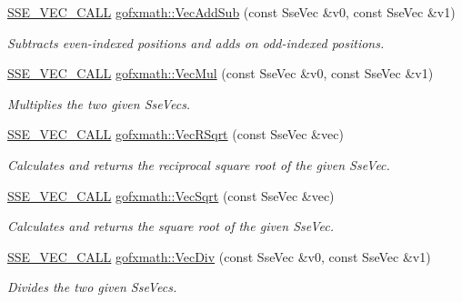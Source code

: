 \begin{DoxyCompactItemize}
\hyperlink{ssevec__math__defs_8h_a97454f977a5281455cecacce1e8ba670}{S\+S\+E\+\_\+\+V\+E\+C\+\_\+\+C\+A\+L\+L} \hyperlink{group___s_i_m_d_vec_math_gac6a154e8cd9fe66c30e8b2302815b0df}{gofxmath\+::\+Vec\+Add\+Sub} (const Sse\+Vec \&v0, const Sse\+Vec \&v1)
\begin{DoxyCompactList}\small\item\em Subtracts even-\/indexed positions and adds on odd-\/indexed positions. \end{DoxyCompactList}\item 
\hyperlink{ssevec__math__defs_8h_a97454f977a5281455cecacce1e8ba670}{S\+S\+E\+\_\+\+V\+E\+C\+\_\+\+C\+A\+L\+L} \hyperlink{group___s_i_m_d_vec_math_ga8bd586fb40d6514eb52c04f8ded33a74}{gofxmath\+::\+Vec\+Mul} (const Sse\+Vec \&v0, const Sse\+Vec \&v1)
\begin{DoxyCompactList}\small\item\em Multiplies the two given Sse\+Vecs. \end{DoxyCompactList}\item 
\hyperlink{ssevec__math__defs_8h_a97454f977a5281455cecacce1e8ba670}{S\+S\+E\+\_\+\+V\+E\+C\+\_\+\+C\+A\+L\+L} \hyperlink{group___s_i_m_d_vec_math_gae4bc9cf7c5e4eeddd2e8b3f869798033}{gofxmath\+::\+Vec\+R\+Sqrt} (const Sse\+Vec \&vec)
\begin{DoxyCompactList}\small\item\em Calculates and returns the reciprocal square root of the given Sse\+Vec. \end{DoxyCompactList}\item 
\hyperlink{ssevec__math__defs_8h_a97454f977a5281455cecacce1e8ba670}{S\+S\+E\+\_\+\+V\+E\+C\+\_\+\+C\+A\+L\+L} \hyperlink{group___s_i_m_d_vec_math_ga5a870dbad6fdb8496b2e95104cc15f12}{gofxmath\+::\+Vec\+Sqrt} (const Sse\+Vec \&vec)
\begin{DoxyCompactList}\small\item\em Calculates and returns the square root of the given Sse\+Vec. \end{DoxyCompactList}\item 
\hyperlink{ssevec__math__defs_8h_a97454f977a5281455cecacce1e8ba670}{S\+S\+E\+\_\+\+V\+E\+C\+\_\+\+C\+A\+L\+L} \hyperlink{group___s_i_m_d_vec_math_ga1aa6bb34526133e71f288a8e1e100fb1}{gofxmath\+::\+Vec\+Div} (const Sse\+Vec \&v0, const Sse\+Vec \&v1)
\begin{DoxyCompactList}\small\item\em Divides the two given Sse\+Vecs. \end{DoxyCompactList}\item 

\end{DoxyCompactItemize}
